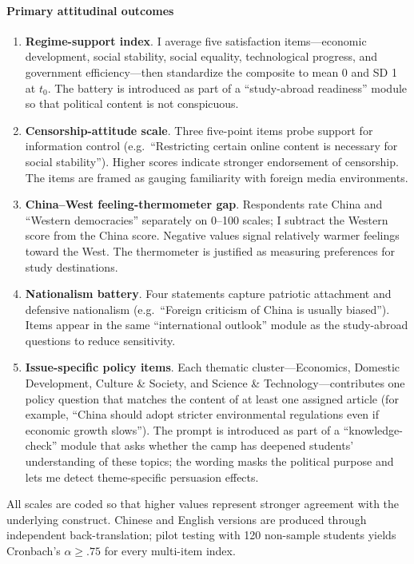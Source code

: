 \documentclass[12pt, american]{article}
\begin{document}
\paragraph{Primary attitudinal outcomes}

\begin{enumerate}[label=\arabic*.]
\item \textbf{Regime-support index}.  I average five satisfaction items—economic development, social stability, social equality, technological progress, and government efficiency—then standardize the composite to mean 0 and SD 1 at $t_{0}$.  The battery is introduced as part of a “study-abroad readiness” module so that political content is not conspicuous.

\item \textbf{Censorship-attitude scale}.  Three five-point items probe support for information control (e.g.\ “Restricting certain online content is necessary for social stability”).  Higher scores indicate stronger endorsement of censorship.  The items are framed as gauging familiarity with foreign media environments.

\item \textbf{China–West feeling-thermometer gap}.  Respondents rate China and “Western democracies” separately on 0–100 scales; I subtract the Western score from the China score.  Negative values signal relatively warmer feelings toward the West.  The thermometer is justified as measuring preferences for study destinations.

\item \textbf{Nationalism battery}.  Four statements capture patriotic attachment and defensive nationalism (e.g.\ “Foreign criticism of China is usually biased”).  Items appear in the same “international outlook” module as the study-abroad questions to reduce sensitivity.

\item \textbf{Issue-specific policy items}.  Each thematic cluster—Economics, Domestic Development, Culture \& Society, and Science \& Technology—contributes one policy question that matches the content of at least one assigned article (for example, “China should adopt stricter environmental regulations even if economic growth slows”).  The prompt is introduced as part of a “knowledge-check” module that asks whether the camp has deepened students’ understanding of these topics; the wording masks the political purpose and lets me detect theme-specific persuasion effects.
\end{enumerate}
All scales are coded so that higher values represent stronger agreement with the underlying construct.  Chinese and English versions are produced through independent back-translation; pilot testing with 120 non-sample students yields Cronbach’s $\alpha \ge .75$ for every multi-item index.
\end{document}

